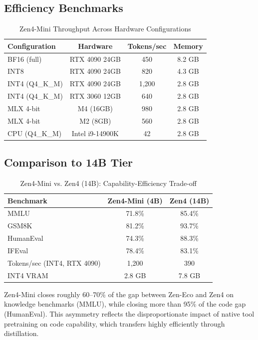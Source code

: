 \documentclass[11pt,a4paper]{article}
\begin{document}
\subsection{Efficiency Benchmarks}

\begin{table}[H]
\centering
\begin{tabular}{lccc}
\toprule
\textbf{Configuration} & \textbf{Hardware} & \textbf{Tokens/sec} & \textbf{Memory} \\
\midrule
BF16 (full)     & RTX 4090 24GB    & 450  & 8.2 GB \\
INT8            & RTX 4090 24GB    & 820  & 4.3 GB \\
INT4 (Q4\_K\_M) & RTX 4090 24GB    & 1,200 & 2.8 GB \\
INT4 (Q4\_K\_M) & RTX 3060 12GB    & 640  & 2.8 GB \\
MLX 4-bit       & M4 (16GB)        & 980  & 2.8 GB \\
MLX 4-bit       & M2 (8GB)         & 560  & 2.8 GB \\
CPU (Q4\_K\_M)  & Intel i9-14900K  & 42   & 2.8 GB \\
\bottomrule
\end{tabular}
\caption{Zen4-Mini Throughput Across Hardware Configurations}
\end{table}

\subsection{Comparison to 14B Tier}

\begin{table}[H]
\centering
\begin{tabular}{lcc}
\toprule
\textbf{Benchmark} & \textbf{Zen4-Mini (4B)} & \textbf{Zen4 (14B)} \\
\midrule
MMLU         & 71.8\% & 85.4\% \\
GSM8K        & 81.2\% & 93.7\% \\
HumanEval    & 74.3\% & 88.3\% \\
IFEval       & 78.4\% & 83.1\% \\
Tokens/sec (INT4, RTX 4090) & 1,200 & 390 \\
INT4 VRAM    & 2.8 GB & 7.8 GB \\
\bottomrule
\end{tabular}
\caption{Zen4-Mini vs. Zen4 (14B): Capability-Efficiency Trade-off}
\end{table}

Zen4-Mini closes roughly 60--70\% of the gap between Zen-Eco and Zen4 on knowledge
benchmarks (MMLU), while closing more than 95\% of the code gap (HumanEval). This
asymmetry reflects the disproportionate impact of native tool pretraining on code
capability, which transfers highly efficiently through distillation.
\end{document}
